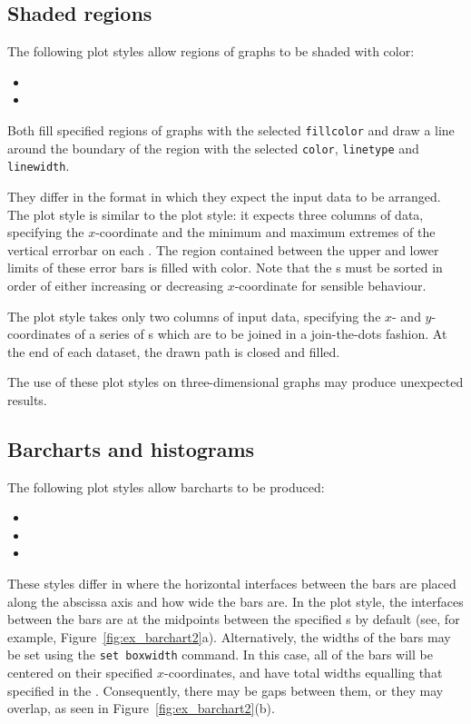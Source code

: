 \subsection{Shaded regions}

The following plot styles allow regions of graphs to be shaded with color:

\begin{itemize}
\item {}
\item {}
\end{itemize}

Both fill specified regions of graphs with the selected
{\tt fillcolor} and draw a line around the boundary of the region with the
selected {\tt color}, {\tt linetype} and {\tt linewidth}.

They differ in the format in which they expect the input data to be arranged.
The  plot style is similar to the 
plot style: it expects three columns of data, specifying the $x$-coordinate and
the minimum and maximum extremes of the vertical errorbar on each \datapoint.
The region contained between the upper and lower limits of these error bars is
filled with color.  Note that the \datapoint s must be sorted in order of
either increasing or decreasing $x$-coordinate for sensible behaviour.

The  plot style takes only two columns of input data,
specifying the $x$- and $y$-coordinates of a series of \datapoint s which are
to be joined in a join-the-dots fashion. At the end of each dataset, the drawn
path is closed and filled.

The use of these plot styles on three-dimensional graphs may produce unexpected
results.

\subsection{Barcharts and histograms}
\label{sec:barcharts}

The following plot styles allow barcharts to be produced:
\begin{itemize}
\item {}
\item {}
\item {}
\end{itemize}
These styles differ in where the horizontal interfaces between the
bars are placed along the abscissa axis and how wide the bars are.  In the
 plot style, the interfaces between the bars are at the midpoints
between the specified \datapoint s by default (see, for example,
Figure~\ref{fig:ex_barchart2}a).  Alternatively, the widths of the bars may be
set using the {\tt set boxwidth} command. In this case, all of the bars will be
centered on their specified $x$-coordinates, and have total widths equalling
that specified in the . Consequently, there may be gaps
between them, or they may overlap, as seen in Figure~\ref{fig:ex_barchart2}(b).

